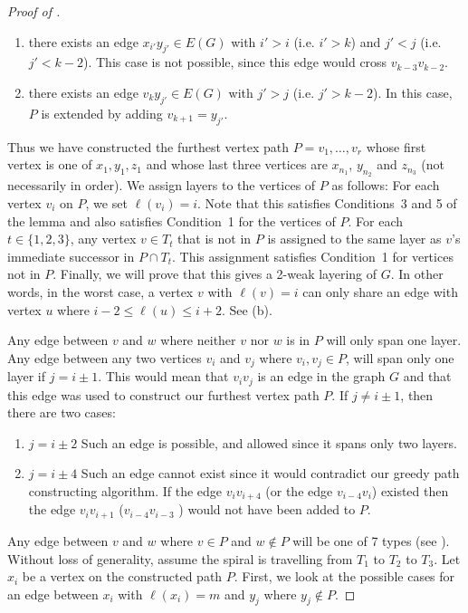 \documentclass{patmorin}
\begin{document}
\begin{proof}[Proof of ]
\begin{enumerate}
  \item there exists an edge $x_{i'}y_{j'}\in E(G)$ with $i' > i$
    (i.e. $i' > k$) and $j'< j$ (i.e. $j'< k-2$).  This case is not possible, since this edge would cross $v_{k-3}v_{k-2}$.

  \item there exists an edge $v_k y_{j'}\in E(G)$ with $j' >j$  (i.e. $j'> k-2$).  In this case, $P$ is extended by adding $v_{k+1}=y_{j'}$.
  \end{enumerate}


  Thus we have constructed the furthest vertex path $P=v_1,\ldots,v_r$ whose first vertex is one of
  $x_1,y_1,z_1$ and whose last three vertices are $x_{n_1}$,
  $y_{n_2}$ and $z_{n_3}$ (not necessarily in order).  We assign layers
  to the vertices of $P$ as follows: For each vertex $v_i$ on $P$,
  we set $\ell(v_i)=i$.  Note that this satisfies Conditions~3 and 5
  of the lemma and also satisfies Condition~1 for the vertices of $P$.
  For each $t\in\{1,2,3\}$, any vertex $v\in T_t$ that is not in
  $P$ is assigned to the same layer as $v$'s immediate successor in $P\cap T_t$.
  This assignment satisfies Condition~1 for vertices not in $P$.
  Finally, we will prove that this gives a 2-weak layering of $G$. In other words,
  in the worst case, a vertex $v$ with $\ell(v)=i$ can only share an edge with vertex $u$ where  $i-2 \le \ell(u) \le i+2$.  See (b).

 Any edge between $v$ and $w$ where neither $v$ nor $w$ is in $P$ will only span one layer.
 Any edge between any two vertices $v_i$ and $v_j$ where $v_i, v_j \in P$, will span only one layer if $j = i\pm1$.
 This would mean that $v_{i}v_{j}$ is an edge in the graph $G$
 and that this edge was used to construct our furthest vertex path $P$.
 If $j \neq i\pm1$, then there are two cases:
   \begin{enumerate}
	\item $j = i \pm 2$ Such an edge is possible, and allowed since it spans only two layers. %
	\item $j = i \pm 4$ Such an edge cannot exist since it would contradict our greedy path constructing algorithm.
	If the edge $v_iv_{i+4}$ (or the edge $v_{i-4}v_i$) existed then the edge $v_i v_{i+1}$ ($v_{i-4}v_{i-3}$ ) would not have been added to $P$.
   \end{enumerate}

 Any edge between $v$ and $w$ where $v \in P$ and $w \not\in P$ will be one of 7 types (see ).
 Without loss of generality, assume the spiral is travelling from $T_1$ to $T_2$ to $T_3$. Let $x_i$ be a vertex on the constructed path $P$.
 First, we look at the possible cases for an edge between $x_i$ with $\ell(x_i) = m$ and $y_j$ where $y_j \notin P$.



\end{proof}
\end{document}
